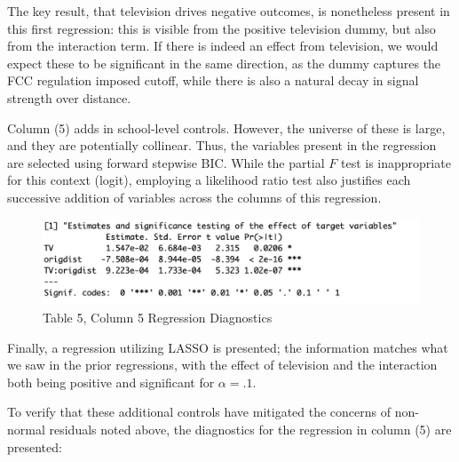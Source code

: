 \documentclass{article}
\begin{document}
The key result, that television drives negative outcomes, is nonetheless present in this first regression: this is visible from the positive television dummy, but also from the interaction term. If there is indeed an effect from television, we would expect these to be significant in the same direction, as the dummy captures the FCC regulation imposed cutoff, while there is also a natural decay in signal strength over distance.  

Column (5) adds in school-level controls. However, the universe of these is large, and they are potentially collinear.  Thus, the variables present in the regression are selected using forward stepwise BIC. While the partial $F$ test is inappropriate for this context (logit), employing a likelihood ratio test also justifies each successive addition of variables across the columns of this regression.
\clearpage

\begin{figure}[!hbtp]
\centering
\caption{Table 5, Column 5 Regression Diagnostics}
\includegraphics[width=12cm]{../explore/Output/regs/edu_OOSLasso}
\end{figure} 

Finally, a regression utilizing LASSO is presented; the information matches what we saw in the prior regressions, with the effect of television and the interaction both being positive and significant for $\alpha = .1$.

To verify that these additional controls have mitigated the concerns of non-normal residuals noted above, the diagnostics for the regression in column (5) are presented:
\end{document}
